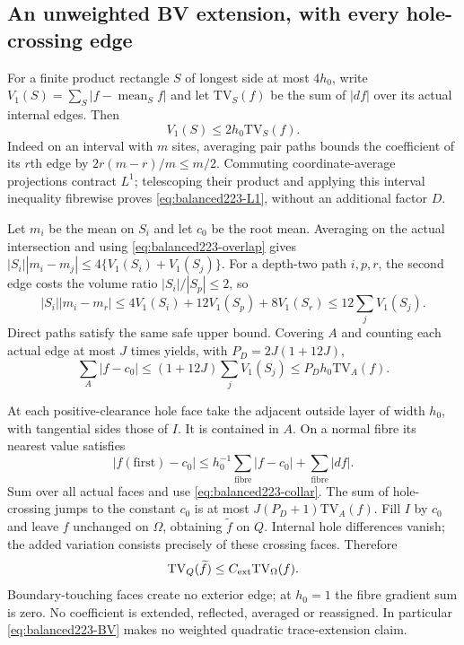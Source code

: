 \subsection{An unweighted BV extension, with every hole-crossing edge}
For a finite product rectangle $S$ of longest side at most $4h_0$, write
$V_1(S)=\sum_S|f-\operatorname{mean}_S f|$ and let $\mathrm{TV}_S(f)$
be the sum of $|df|$ over its actual internal edges. Then
\begin{equation}\label{eq:balanced223-L1}
 V_1(S)\le2h_0\mathrm{TV}_S(f).
\end{equation}
Indeed on an interval with $m$ sites, averaging pair paths bounds the
coefficient of its $r$th edge by $2r(m-r)/m\le m/2$.
Commuting coordinate-average projections contract $L^1$; telescoping their
product and applying this interval inequality fibrewise proves
\eqref{eq:balanced223-L1}, without an additional factor $D$.

Let $m_i$ be the mean on $S_i$ and let $c_0$ be the root mean.
Averaging on the actual intersection and using
\eqref{eq:balanced223-overlap} gives
$|S_i||m_i-m_j|\le4\{V_1(S_i)+V_1(S_j)\}$.
For a depth-two path $i,p,r$, the second edge costs the volume ratio
$|S_i|/|S_p|\le2$, so
\[
 |S_i||m_i-m_r|
 \le4V_1(S_i)+12V_1(S_p)+8V_1(S_r)
 \le12\sum_j V_1(S_j).
\]
Direct paths satisfy the same safe upper bound. Covering $A$ and counting
each actual edge at most $J$ times yields, with $P_D=2J(1+12J)$,
\begin{equation}\label{eq:balanced223-collar}
 \sum_A|f-c_0|\le(1+12J)\sum_jV_1(S_j)
 \le P_Dh_0\mathrm{TV}_A(f).
\end{equation}

At each positive-clearance hole face take the adjacent outside layer
of width $h_0$, with tangential sides those of $I$. It is contained in
$A$. On a normal fibre its nearest value satisfies
\[
 |f(\mathrm{first})-c_0|
 \le h_0^{-1}\sum_{\mathrm{fibre}}|f-c_0|
       +\sum_{\mathrm{fibre}}|df|.
\]
Sum over all actual faces and use \eqref{eq:balanced223-collar}.
The sum of hole-crossing jumps to the constant $c_0$ is at most
$J(P_D+1)\mathrm{TV}_A(f)$. Fill $I$ by $c_0$ and leave $f$ unchanged
on $\Omega$, obtaining $\widetilde f$ on $Q$. Internal hole differences
vanish; the added variation consists precisely of these crossing faces.
Therefore
\begin{equation}\label{eq:balanced223-BV}
 \mathrm{TV}_Q(\widetilde f)
 \le C_{\rm ext}\mathrm{TV}_\Omega(f).
\end{equation}
Boundary-touching faces create no exterior edge; at $h_0=1$ the fibre
gradient sum is zero. No coefficient is extended, reflected, averaged or
reassigned. In particular \eqref{eq:balanced223-BV} makes no weighted
quadratic trace-extension claim.

